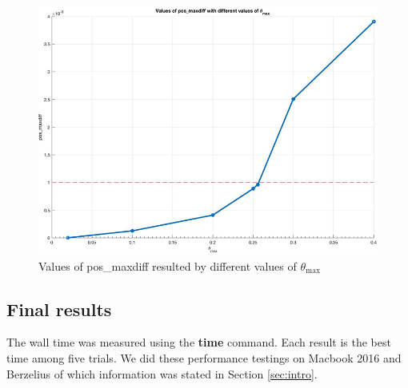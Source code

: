 \documentclass[12pt,oneside,a4paper]{article}
\begin{document}
\begin{figure}[h]
	\centering
	\includegraphics[scale=0.5]{theta_max.jpg}
	\caption{Values of pos\_maxdiff resulted by different values of $\theta_{\max}$}
	\label{fig:theta_max}
\end{figure}

\subsection{Final results}

The wall time was measured using the \textbf{time} command. Each result is the best time among five trials. We did these performance testings on Macbook 2016 and Berzelius of which information was stated in Section \ref{sec:intro}.

\begin{table}[h]
\centering
\caption{Final performance results with different optimization flags (in seconds)}
\label{tab:struct_particle}
\end{table}
\end{document}
